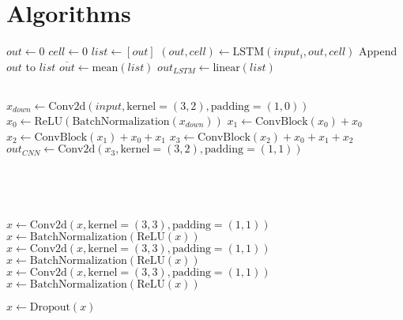 \chapter{Algorithms} \label{chapter:code}

\begin{center}

 \label{algo:CNNLSTM}
\begin{algorithmic}[1]
	\State $out \gets 0$ 
	\State $cell \gets 0$
	\State $list \gets [out]$
	 
		\State $(out, cell) \gets \textrm{LSTM}(input_i, out, cell)$
		\State Append $out$ to $list$
	\EndFor
	\State $\overline{out} \gets \textrm{mean}(list)$ 
	\State $out_{LSTM} \gets \textrm{linear}(list)$ 
	
	\\
	
	\State $x_{down} \gets \textrm{Conv2d}(input, \textrm{kernel}=(3,2), \textrm{padding}=(1,0))$ 
	\State $x_0 \gets \textrm{ReLU}(\textrm{BatchNormalization}(x_{down}))$
	\State $x_1 \gets \textrm{ConvBlock}(x_0) + x_0$ 
	\State $x_2 \gets \textrm{ConvBlock}(x_1) + x_0 + x_1$
	\State $x_3 \gets \textrm{ConvBlock}(x_2) + x_0 + x_1 + x_2$
	\State $out_{CNN} \gets \textrm{Conv2d}(x_3, \textrm{kernel}=(3,2), \textrm{padding}=(1,1))$ 
	
	\\
	
	\State {}
	
	\EndProcedure
	
	\\
	
	
	
	\State $x \gets \textrm{Conv2d}(x, \textrm{kernel}=(3,3), \textrm{padding}=(1,1))$ 
	\State $x \gets \textrm{BatchNormalization}(\textrm{ReLU}(x))$
	\State $x \gets \textrm{Conv2d}(x, \textrm{kernel}=(3,3), \textrm{padding}=(1,1))$
	\State $x \gets \textrm{BatchNormalization}(\textrm{ReLU}(x))$
	\State $x \gets \textrm{Conv2d}(x, \textrm{kernel}=(3,3), \textrm{padding}=(1,1))$
	\State $x \gets \textrm{BatchNormalization}(\textrm{ReLU}(x))$
	
	\State $x \gets \textrm{Dropout}(x)$
	
	\State {}
	
	\EndProcedure
\end{algorithmic}
\end{center}





